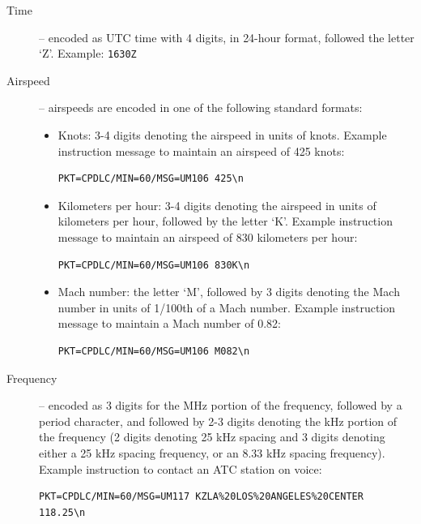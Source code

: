 \documentclass[a4paper,12pt]{article}
\begin{document}
\begin{description}
\begin{itemize}
\end{itemize}

\item[Time] -- encoded as UTC time with 4 digits, in 24-hour format,
followed the letter `Z'. Example: \texttt{1630Z}

\item[Airspeed] -- airspeeds are encoded in one of the following standard
formats:

\begin{itemize}

\item Knots: 3-4 digits denoting the airspeed in units of knots. Example
instruction message to maintain an airspeed of 425 knots:

\begin{verbatim}
PKT=CPDLC/MIN=60/MSG=UM106 425\n
\end{verbatim}

\item Kilometers per hour: 3-4 digits denoting the airspeed in units
of kilometers per hour, followed by the letter `K'. Example instruction
message to maintain an airspeed of 830 kilometers per hour:

\begin{verbatim}
PKT=CPDLC/MIN=60/MSG=UM106 830K\n
\end{verbatim}

\item Mach number: the letter `M', followed by 3 digits denoting the
Mach number in units of 1/100th of a Mach number. Example instruction
message to maintain a Mach number of 0.82:

\begin{verbatim}
PKT=CPDLC/MIN=60/MSG=UM106 M082\n
\end{verbatim}

\end{itemize}

\item[Frequency] -- encoded as 3 digits for the MHz portion of the
frequency, followed by a period character, and followed by 2-3 digits
denoting the kHz portion of the frequency (2 digits denoting 25 kHz
spacing and 3 digits denoting either a 25 kHz spacing frequency, or
an 8.33 kHz spacing frequency). Example instruction to contact an
ATC station on voice:

\begin{verbatim}
PKT=CPDLC/MIN=60/MSG=UM117 KZLA%20LOS%20ANGELES%20CENTER 118.25\n
\end{verbatim}


\end{description}
\end{document}
